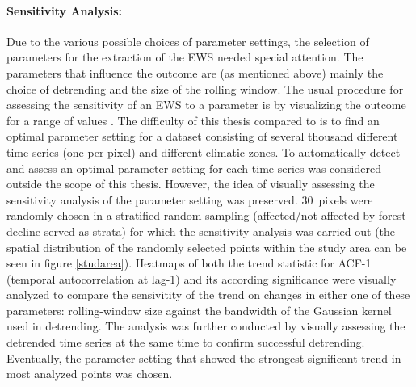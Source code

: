 \paragraph{Sensitivity Analysis:}
Due to the various possible choices of parameter settings, the selection of parameters for the extraction of the EWS needed special attention. The parameters that influence the outcome are (as mentioned above) mainly the choice of detrending and the size of the rolling window. The usual procedure for assessing the sensitivity of an EWS to a parameter is by visualizing the outcome for a range of values \citep{dakos2008}. The difficulty of this thesis compared to \cite{dakos2008} is to find an optimal parameter setting for a dataset consisting of several thousand different time series (one per pixel) and different climatic zones. To automatically detect and assess an optimal parameter setting for each time series was considered outside the scope of this thesis. However, the idea of visually assessing the sensitivity analysis of the parameter setting was preserved. 30~pixels were randomly chosen in a stratified random sampling (affected/not affected by forest decline served as strata) for which the sensitivity analysis was carried out (the spatial distribution of the randomly selected points within the study area can be seen in figure \ref{studarea}). Heatmaps of both the trend statistic for ACF-1 (temporal autocorrelation at lag-1) and its according significance were visually analyzed to compare the sensivitity of the trend on changes in either one of these parameters: rolling-window size against the bandwidth of the Gaussian kernel used in detrending. The analysis was further conducted by visually assessing the detrended time series at the same time to confirm successful detrending. Eventually, the parameter setting that showed the strongest significant trend in most analyzed points was chosen.\\



